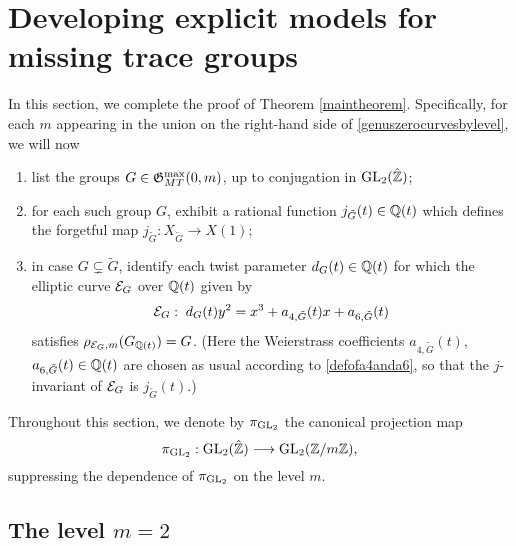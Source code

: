 \section{Developing explicit models for missing trace groups} \label{proofofmaintheoremsection}

In this section, we complete the proof of Theorem \ref{maintheorem}. Specifically, for each $m$ appearing in the union on the right-hand side of \eqref{genuszerocurvesbylevel}, we will now
\begin{enumerate}
\item list the groups $G \in \mathfrak{G}_{MT}^{\max}(0,m)$, up to conjugation in $\operatorname{GL}_2(\hat{\mathbb{Z}})$;
\item for each such group $G$, exhibit a rational function $j_{\tilde{G}}(t) \in \mathbb{Q}(t)$ which defines the forgetful map $j_{\tilde{G}} : X_{\tilde{G}} \longrightarrow X(1)$;
\item in case $G \subsetneq \tilde{G}$, identify each twist parameter $d_G(t) \in \mathbb{Q}(t)$ for which the elliptic curve $\mathcal{E}_G$ over $\mathbb{Q}(t)$ given by
\[
\mathcal{E}_G : \; d_G(t) y^2 = x^3 + a_{4,\tilde{G}}(t) x + a_{6,\tilde{G}}(t)
\]
satisfies $\rho_{\mathcal{E}_G,m}(G_{\mathbb{Q}(t)}) = G$. (Here the Weierstrass coefficients $a_{4,\tilde{G}}(t)$, $a_{6,\tilde{G}}(t) \in \mathbb{Q}(t)$ are chosen as usual according to \eqref{defofa4anda6}, so that the $j$-invariant of $\mathcal{E}_G$ is $j_{\tilde{G}}(t)$.)
\end{enumerate}
Throughout this section, we denote by $\pi_{\operatorname{GL}_2}$ the canonical projection map
\[
\pi_{\operatorname{GL}_2} : \operatorname{GL}_2(\hat{\mathbb{Z}}) \longrightarrow \operatorname{GL}_2(\mathbb{Z}/m\mathbb{Z}),
\]
suppressing the dependence of $\pi_{\operatorname{GL}_2}$ on the level $m$.

\medskip

\subsection{The level \texorpdfstring{$m=2$}.}

